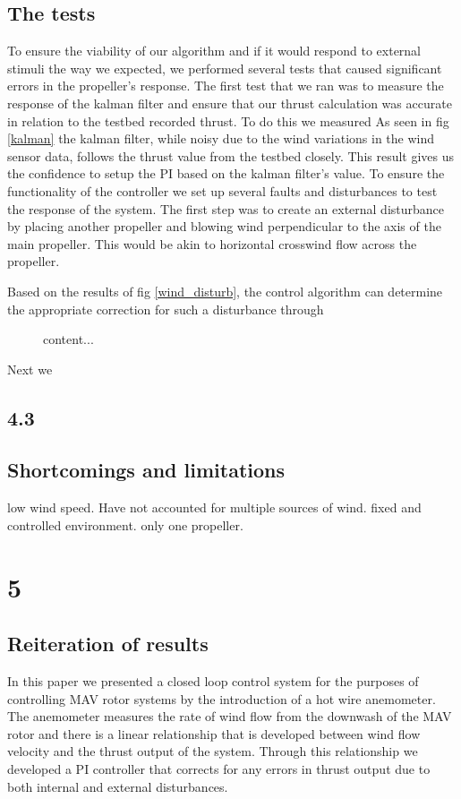 \documentclass[conference]{IEEEtran}
\begin{document}
	\subsection{The tests}
	To ensure the viability of our algorithm and if it would respond to external stimuli the way we expected, we performed several tests that caused significant errors in the propeller's response. The first test that we ran was to measure the response of the kalman filter and ensure that our thrust calculation was accurate in relation to the testbed recorded thrust. To do this we measured  As seen in fig \ref{kalman} the kalman filter, while noisy due to the wind variations in the wind sensor data, follows the thrust value from the testbed closely. This result gives us the confidence to setup the PI based on the kalman filter's value. 
	To ensure the functionality of the controller we set up several faults and disturbances to test the response of the system. The first step was to create an external disturbance by placing another propeller and blowing wind perpendicular to the axis of the main propeller. This would be akin to horizontal crosswind flow across the propeller.
	\begin{figure}
		\label{content...}
	\end{figure}
	 Based on the results of fig \ref{wind_disturb}, the control algorithm can determine the appropriate correction for such a disturbance through
	\begin{figure}
		content...
	\end{figure}
	Next we 
	\subsection{4.3}
	\subsection{Shortcomings and limitations}
	low wind speed. Have not accounted for multiple sources of wind. fixed and controlled environment. only one propeller. 
	\section{5}
	\subsection{Reiteration of results}
	In this paper we presented a closed loop control system for the purposes of controlling MAV rotor systems by the introduction of a hot wire anemometer. The anemometer measures the rate of wind flow from the downwash of the MAV rotor and there is a linear relationship that is developed between wind flow velocity and the thrust output of the system. Through this relationship we developed a PI controller that corrects for any errors in thrust output due to both internal and external disturbances.
\end{document}
